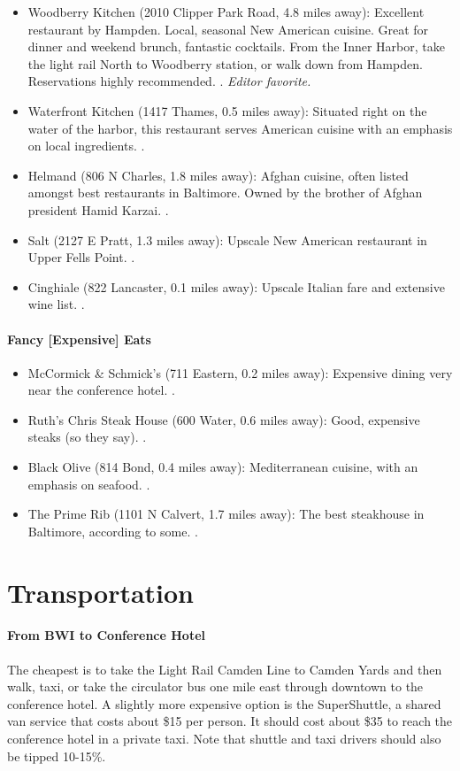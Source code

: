 \begin{itemize}
\item{Woodberry Kitchen (2010 Clipper Park Road, 4.8 miles away): Excellent restaurant by Hampden. Local, seasonal New American cuisine. Great for dinner and weekend brunch, fantastic cocktails. From the Inner Harbor, take the light rail North to Woodberry station, or walk down from Hampden. Reservations highly recommended.  \professor. \it{Editor favorite}.}
\item{Waterfront Kitchen (1417 Thames, 0.5 miles away): Situated right on the water of the harbor, this restaurant serves American cuisine with an emphasis on local ingredients. \professor.}
\item{Helmand (806 N Charles, 1.8 miles away): Afghan cuisine, often listed amongst best restaurants in Baltimore. Owned by the brother of Afghan president Hamid Karzai. \professor.}
\item{Salt (2127 E Pratt, 1.3 miles away): Upscale New American restaurant in Upper Fells Point. \professor.}
\item{Cinghiale (822 Lancaster, 0.1 miles away): Upscale Italian fare and extensive wine list. \industry.}
\end{itemize}

\paragraph*{Fancy [Expensive] Eats}

\begin{itemize}
\item{McCormick \& Schmick's (711 Eastern, 0.2 miles away): Expensive dining very near the conference hotel. \professor.}
\item{Ruth's Chris Steak House (600 Water, 0.6 miles away): Good, expensive steaks (so they say). \industry.}
\item{Black Olive (814 Bond, 0.4 miles away): Mediterranean cuisine, with an emphasis on seafood. \professor.}
\item{The Prime Rib (1101 N Calvert, 1.7 miles away): The best steakhouse in Baltimore, according to some. \industry.}
\end{itemize}

\section{Transportation}

\paragraph*{From BWI to Conference Hotel}
The cheapest is to take the Light Rail Camden Line to Camden Yards and then walk, taxi, or take the circulator bus one mile east through downtown to the conference hotel. A slightly more expensive option is the SuperShuttle, a shared van service that costs about \$15 per person. It should cost about \$35 to reach the conference hotel in a private taxi. Note that shuttle and taxi drivers should also be tipped 10-15\%.

